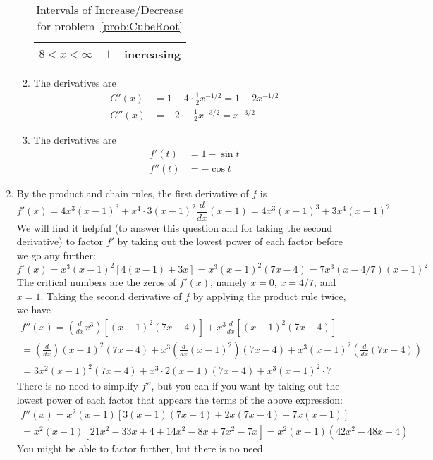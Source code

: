\documentclass{article}
\begin{document}
\begin{enumerate}
\begin{enumerate}
\begin{table}[htbp]
\begin{tabular}{|c|c|c|}
        \hline
        $8<x<\infty$     & $+$          & increasing
        \\
        \hline
      \end{tabular}
      \caption{Intervals of Increase/Decrease for problem~\ref{prob:CubeRoot}}
      \label{tab:CubeRootfp}
    \end{table}
  \item %
    The derivatives are
    \begin{align*}
      G'(x) &= 1 - 4 \cdot \frac{1}{2} x^{-1/2} = 1 - 2 x^{-1/2}
      \\
      G''(x) &= -2 \cdot -\frac{1}{2} x^{-3/2} = x^{-3/2}
    \end{align*}
  \item %
    The derivatives are
    \begin{align*}
      f'(t) &= 1 - \sin t
      \\
      f''(t) &= -\cos t
    \end{align*}
  \end{enumerate}
\item\label{prob:x4x-13} %
  By the product and chain rules, the first derivative of $f$ is
  \begin{equation*}
    f'(x)=4x^3(x-1)^3+x^4\cdot 3(x-1)^2\frac{d}{dx}(x-1) = 4x^3(x-1)^3
    + 3x^4(x-1)^2
  \end{equation*}
  We will find it helpful (to answer this question and for taking the
  second derivative) to factor $f'$ by taking out the lowest power of
  each factor before we go any further:
  \begin{equation*}
    f'(x) = x^3(x-1)^2\left[4(x-1) + 3x\right] = x^3(x-1)^2(7x-4)
    = 7x^3(x-4/7)(x-1)^2
  \end{equation*}
  The critical numbers are the zeros of $f'(x)$, namely $x=0$,
  $x=4/7$, and $x=1$.  Taking the second derivative of $f$ by applying
  the product rule twice, we have
  \begin{multline*}
    f''(x) = \left(\frac{d}{dx} x^3\right) \left[(x-1)^2(7x-4)\right]
    + x^3 \frac{d}{dx} \left[(x-1)^2(7x-4)\right]
    \\
    = \left(\frac{d}{dx}\right) (x-1)^2(7x-4)
    + x^3 \left(\frac{d}{dx}(x-1)^2\right) (7x-4)
    + x^3 (x-1)^2 \left(\frac{d}{dx} (7x-4)\right)
    \\
    = 3x^2(x-1)^2(7x-4) + x^3 \cdot 2(x-1) (7x-4) + x^3(x-1)^2 \cdot 7
  \end{multline*}
  There is no need to simplify $f''$, but you can if you want by
  taking out the lowest power of each factor that appears the terms of
  the above expression:
  \begin{multline*}
    f''(x) = x^2(x-1)\left[3(x-1)(7x-4) + 2x(7x-4) + 7x(x-1)\right]
    \\
    = x^2(x-1)\left[21x^2-33x+4+14x^2-8x+7x^2-7x\right]
    = x^2(x-1) (42x^2-48x+4)
  \end{multline*}
  You might be able to factor further, but there is no need.


\end{enumerate}
\end{document}
